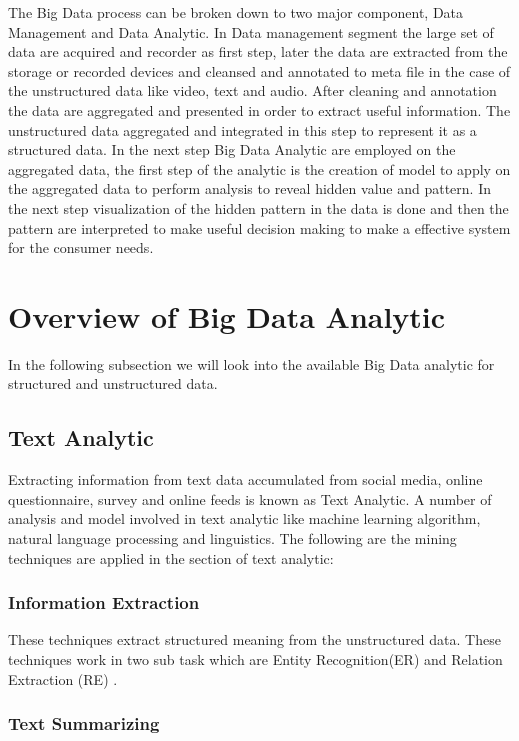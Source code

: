 \documentclass[sigconf]{acmart}
\begin{document}
 The Big Data process can be broken down to two major component, Data Management and Data Analytic. In Data management segment the large set of data are acquired and recorder as first step, later the data are extracted from the storage or recorded devices and cleansed and annotated to meta file in the case of the unstructured data like video, text and audio. After cleaning and annotation the data are aggregated and presented in order to extract useful information. The unstructured data aggregated and integrated in this step to represent it as a structured data. In the next step Big Data Analytic are employed on the aggregated data, the first step of the analytic is the creation of model to apply on the aggregated data to perform analysis to reveal hidden value and pattern. In the next step visualization of the hidden pattern in the data is done and then the pattern are interpreted to make useful decision making to make a effective system for the consumer needs.
 
 \section{Overview of Big Data Analytic}
 In the following subsection we will look into the available Big Data analytic for structured and unstructured data.
 
 \subsection{Text Analytic}
 
 Extracting information from text data accumulated from social media, online questionnaire, survey and online feeds is known as Text Analytic. A number of analysis and model involved in text analytic like machine learning algorithm, natural language processing and linguistics. The following are the mining techniques are applied in the section of text analytic:
 
 
\subsubsection{Information Extraction}

These techniques extract structured meaning from the unstructured data. These techniques work in two sub task which are Entity Recognition(ER) \cite{bigdata} and Relation Extraction (RE) \cite{bigdata}.

\subsubsection{Text Summarizing}
\end{document}
